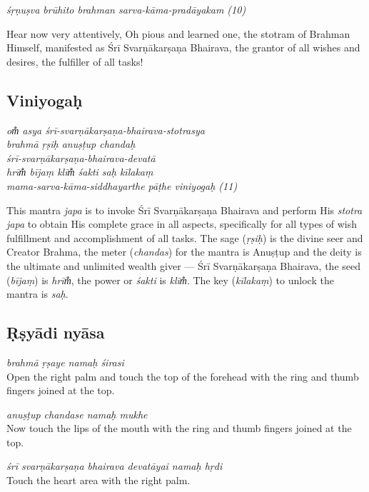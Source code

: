 \documentclass[12pt,oneside,a4paper]{article}
\newenvironment{shloka}[1]
  {\bigskip\center#1\varwidth{\linewidth}}
  {\endvarwidth\endcenter\bigskip}
\newcommand{\tl}[1]{\emph{#1}}
\begin{document}
\begin{shloka}\itshape
  śṛṇuṣva brūhito brahman sarva-kāma-pradāyakam (10)
\end{shloka}

Hear now very attentively, Oh pious and learned one, the stotram of Brahman
Himself, manifested as Śrī Svarṇākarṣaṇa Bhairava, the grantor of all wishes
and desires, the fulfiller of all tasks!

\subsection{Viniyogaḥ}

\begin{shloka}\itshape
  om̐ asya śrī-svarṇākarṣaṇa-bhairava-stotrasya\\
  brahmā ṛṣiḥ anuṣṭup chandaḥ\\
  śrī-svarṇākarṣaṇa-bhairava-devatā\\
  hrīm̐ bījaṃ klīm̐ śakti saḥ kīlakaṃ\\
  mama-sarva-kāma-siddhayarthe pāṭhe viniyogaḥ (11)
\end{shloka}

This mantra \tl{japa} is to invoke Śrī Svarṇākarṣaṇa Bhairava and perform His
\tl{stotra japa} to obtain His complete grace in all aspects, specifically for
all types of wish fulfillment and accomplishment of all tasks. The sage
(\tl{ṛṣiḥ}) is the divine seer and Creator Brahma, the meter (\tl{chandas}) for
the mantra is Anuṣṭup and the deity is the ultimate and unlimited wealth giver —
Śrī Svarṇākarṣaṇa Bhairava, the seed (\tl{bījaṃ}) is \tl{hrīm̐}, the power or
\tl{śakti} is \tl{klīm̐}. The key (\tl{kīlakaṃ}) to unlock the mantra is \tl{saḥ}.

\subsection{Ṛṣyādi nyāsa}

\tl{brahmā ṛṣaye namaḥ śirasi}\\
Open the right palm and touch the top of the forehead with the ring and thumb
fingers joined at the top.

\tl{anuṣṭup chandase namaḥ mukhe}\\
Now touch the lips of the mouth with the ring and thumb fingers joined at
the top.

\tl{śrī svarṇākarṣaṇa bhairava devatāyai namaḥ hṛdi}\\
Touch the heart area with the right palm.
\end{document}
